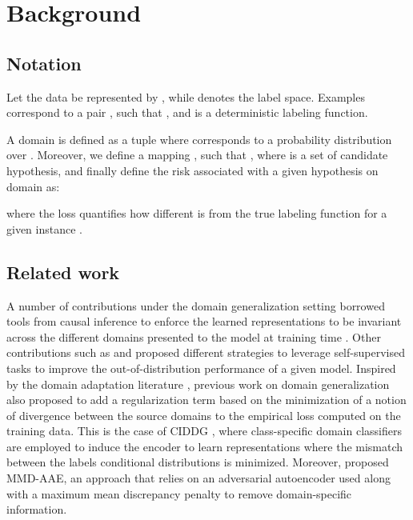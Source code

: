 \documentclass{article}
\begin{document}
\section{Background}\label{sec:background}
\subsection{Notation}
Let the data be represented by , while  denotes the label space. Examples correspond to a pair , such that , and  is a deterministic labeling function. 

A domain is defined as a tuple  where  corresponds to a probability distribution over . Moreover, we define a mapping , such that , where  is a set of candidate hypothesis, and finally define the risk  associated with a given hypothesis  on domain  as:

where the loss  quantifies how different  is from the true labeling function  for a given instance .

\subsection{Related work}\label{sec:rel_work}
A number of contributions under the domain generalization setting borrowed tools from causal inference to enforce the learned representations to be invariant across the different domains presented to the model at training time \cite{arjovsky2019invariant,mahajan2020domain,ahuja2020invariant}. Other contributions such as \cite{carlucci2019domain} and \cite{albuquerque2020improving} proposed different strategies to leverage self-supervised tasks to improve the out-of-distribution performance of a given model.
Inspired by the domain adaptation literature \cite{kifer2004detecting,ben2007analysis,ganin2016domain}, previous work on domain generalization also proposed to add a regularization term based on the minimization of a notion of divergence between the source domains to the empirical loss computed on the training data. This is the case of CIDDG \cite{li2018deep}, where class-specific domain classifiers are employed to induce the encoder to learn representations where the mismatch between the labels conditional distributions is minimized. Moreover, \cite{li2018domain} proposed MMD-AAE, an approach that relies on an adversarial autoencoder used along with a maximum mean discrepancy penalty \cite{gretton2012kernel} to remove domain-specific information. 
\end{document}
